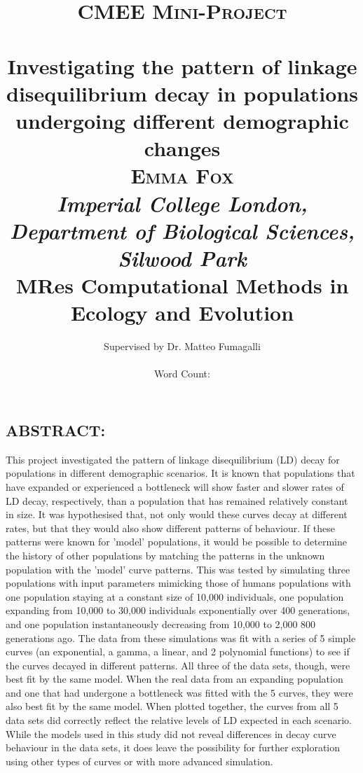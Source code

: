 \documentclass[11pt]{article}
\title{	\huge \textsc{CMEE Mini-Project}
		\\ [3.0cm]
		\HRule{1pt} \\
		\LARGE \textbf{Investigating the pattern of linkage disequilibrium decay in populations undergoing different demographic changes}
		\HRule{1pt} \\ [0.2cm]
		\Large \textsc{Emma Fox} \\
		\large \emph{Imperial College London, Department of Biological Sciences, Silwood Park} \\
		\small MRes Computational Methods in Ecology and Evolution
		\\ [9.0cm]}
\author{ 
		Supervised by Dr. Matteo Fumagalli \\ \\
		Word Count: \\
		}
\date{}
\begin{document}
\maketitle

\newpage
\begin{linenumbers}

\section{ABSTRACT:}
This project investigated the pattern of linkage disequilibrium (LD) decay for populations in different demographic scenarios. It is known that populations that have expanded or experienced a bottleneck will show faster and slower rates of LD decay, respectively, than a population that has remained relatively constant in size. It was hypothesised that, not only would these curves decay at different rates, but that they would also show different patterns of behaviour. If these patterns were known for 'model' populations, it would be possible to determine the history of other populations by matching the patterns in the unknown population with the 'model' curve patterns. This was tested by simulating three populations with input parameters mimicking those of humans populations with one population staying at a constant size of 10,000 individuals, one population expanding from 10,000 to 30,000 individuals exponentially over 400 generations, and one population instantaneously decreasing from 10,000 to 2,000 800 generations ago. The data from these simulations was fit with a series of 5 simple curves (an exponential, a gamma, a linear, and 2 polynomial functions) to see if the curves decayed in different patterns. All three of the data sets, though, were best fit by the same model. When the real data from an expanding population and one that had undergone a bottleneck was fitted with the 5 curves, they were also best fit by the same model. When plotted together, the curves from all 5 data sets did correctly reflect the relative levels of LD expected in each scenario. While the models used in this study did not reveal differences in decay curve behaviour in the data sets, it does leave the possibility for further exploration using other types of curves or with more advanced simulation.     


\end{linenumbers}
\end{document}
